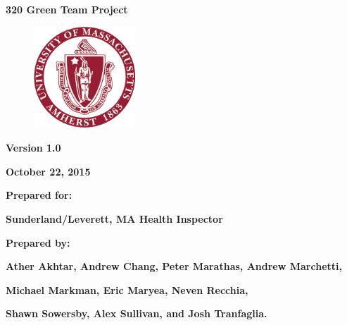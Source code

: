 \documentclass[twoside,letterpaper]{article}
\begin{document}
\clearpage\setcounter{page}{1}\pagestyle{Standard}
\thispagestyle{FirstPage}


\bigskip

{\centering{}\bfseries\color{black}
320 Green Team Project
\par}


\bigskip


\begin{figure}
\centering
\includegraphics[width=1.5in,height=1.5in]{Uma_seal.png}\end{figure}

\bigskip


\bigskip

{\centering{}\bfseries\color{black}
Version 1.0
\par}

{\centering{}\bfseries\color{black}
October 22, 2015
\par}


\bigskip


\bigskip

{\centering{}\bfseries\color{black}
Prepared for:
\par}

{\centering{}\bfseries\color{black}
Sunderland/Leverett, MA Health Inspector
\par}


\bigskip


\bigskip

{\centering{}\bfseries\color{black}
Prepared by:
\par}

{\centering{}\bfseries\color{black}
Ather Akhtar, Andrew Chang, Peter Marathas, Andrew Marchetti, \par} 
{\centering{}\bfseries\color{black}
 Michael Markman, Eric Maryea, Neven Recchia,
\par}
{\centering{}\bfseries\color{black}
Shawn Sowersby, Alex Sullivan, and Josh Tranfaglia.\par}
\end{document}
